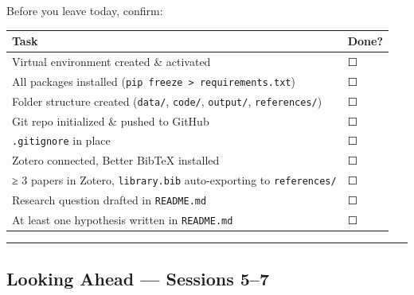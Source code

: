 \documentclass[
  letterpaper,
  DIV=11,
  numbers=noendperiod]{scrartcl}
\begin{document}
Before you leave today, confirm:

\begin{longtable}[]{@{}
  >{\raggedright\arraybackslash}p{}
  >{\raggedright\arraybackslash}p{}@{}}
\toprule\noalign{}
\begin{minipage}[b]{\linewidth}\raggedright
Task
\end{minipage} & \begin{minipage}[b]{\linewidth}\raggedright
Done?
\end{minipage} \\
\midrule\noalign{}
\endhead
\bottomrule\noalign{}
\endlastfoot
Virtual environment created \& activated & ☐ \\
All packages installed
(\texttt{pip\ freeze\ \textgreater{}\ requirements.txt}) & ☐ \\
Folder structure created (\texttt{data/}, \texttt{code/},
\texttt{output/}, \texttt{references/}) & ☐ \\
Git repo initialized \& pushed to GitHub & ☐ \\
\texttt{.gitignore} in place & ☐ \\
Zotero connected, Better BibTeX installed & ☐ \\
≥ 3 papers in Zotero, \texttt{library.bib} auto-exporting to
\texttt{references/} & ☐ \\
Research question drafted in \texttt{README.md} & ☐ \\
At least one hypothesis written in \texttt{README.md} & ☐ \\
\end{longtable}

\begin{center}\rule{0.5\linewidth}{0.5pt}\end{center}

\subsection{Looking Ahead --- Sessions
5--7}\label{looking-ahead-sessions-57}
\end{document}
